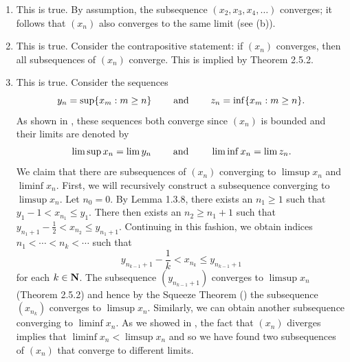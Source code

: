 \documentclass{lew98_solutions}
\begin{document}
\begin{solution}
    \begin{enumerate}
        \item This is true. By assumption, the subsequence \( (x_2, x_3, x_4, \ldots) \) converges; it follows that \( (x_n) \) also converges to the same limit (see  (b)).

        \item This is true. Consider the contrapositive statement: if \( (x_n) \) converges, then all subsequences of \( (x_n) \) converge. This is implied by Theorem 2.5.2.

        \item This is true. Consider the sequences
        \[
            y_n = \sup \{ x_m : m \geq n \} \hspace{8mm} \text{and} \hspace{8mm} z_n = \inf \{ x_m : m \geq n \}.
        \]
        As shown in , these sequences both converge since \( (x_n) \) is bounded and their limits are denoted by
        \[
            \limsup x_n = \lim y_n \hspace{8mm} \text{and} \hspace{8mm} \liminf x_n = \lim z_n.
        \]
        We claim that there are subsequences of \( (x_n) \) converging to \( \limsup x_n \) and \( \liminf x_n \). First, we will recursively construct a subsequence converging to \( \limsup x_n \). Let \( n_0 = 0 \). By Lemma 1.3.8, there exists an \( n_1 \geq 1 \) such that \( y_1 - 1 < x_{n_1} \leq y_1 \). There then exists an \( n_2 \geq n_1 + 1 \) such that \( y_{n_1 + 1} - \tfrac{1}{2} < x_{n_2} \leq y_{n_1 + 1} \). Continuing in this fashion, we obtain indices \( n_1 < \cdots < n_k < \cdots \) such that
        \[
            y_{n_{k-1} + 1} - \frac{1}{k} < x_{n_k} \leq y_{n_{k-1} + 1}
        \]
        for each \( k \in \mathbf{N} \). The subsequence \( (y_{n_{k-1} + 1}) \) converges to \( \limsup x_n \) (Theorem 2.5.2) and hence by the Squeeze Theorem () the subsequence \( (x_{n_k}) \) converges to \( \limsup x_n \). Similarly, we can obtain another subsequence converging to \( \liminf x_n \). As we showed in , the fact that \( (x_n) \) diverges implies that \( \liminf x_n < \limsup x_n \) and so we have found two subsequences of \( (x_n) \) that converge to different limits.


\end{enumerate}
\end{solution}
\end{document}
